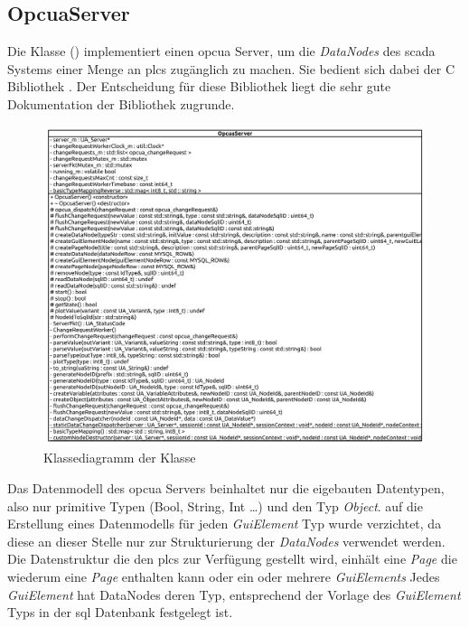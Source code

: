\subsection{OpcuaServer}
Die Klasse  () implementiert einen \ac{opcua} Server, um die \emph{DataNodes} des \ac{scada} Systems einer Menge an \acp{plc} zugänglich zu machen.
Sie bedient sich dabei der C Bibliothek  \citep{open62541:lib}.
Der Entscheidung für diese Bibliothek liegt die sehr gute Dokumentation der Bibliothek zugrunde.
\begin{figure}[ht]
  \centering
  \includegraphics[width=\textwidth]{content/hauptteil/umsetzungPoC/backend/uml/classesOfOverview/OpcuaServer.pdf}
  \caption{Klassediagramm der Klasse }
  \label{fig:backend:classDiag:OpcuaServer}
\end{figure}
Das Datenmodell des \ac{opcua} Servers beinhaltet nur die eigebauten Datentypen, also nur primitive Typen (Bool, String, Int \dots) und den Typ \emph{Object}.
auf die Erstellung eines Datenmodells für jeden \emph{GuiElement} Typ wurde verzichtet, da diese an dieser Stelle nur zur Strukturierung der \emph{DataNodes} verwendet werden.
Die Datenstruktur die den \acp{plc} zur Verfügung gestellt wird, einhält eine \emph{Page} die wiederum eine \emph{Page} enthalten kann oder ein oder mehrere \emph{GuiElements}
Jedes \emph{GuiElement} hat DataNodes deren Typ, entsprechend der Vorlage des \emph{GuiElement} Typs in der \ac{sql} Datenbank festgelegt ist.
